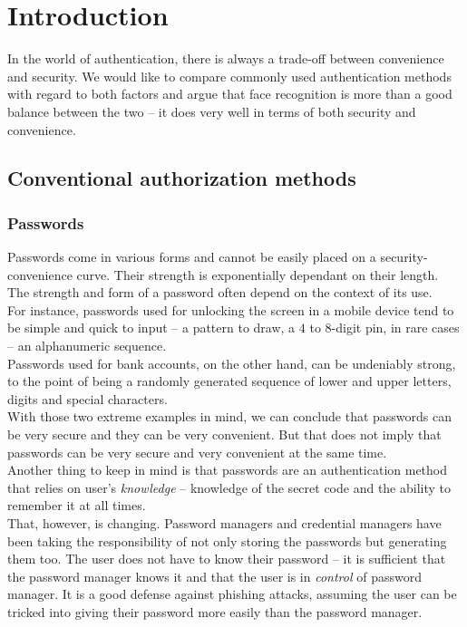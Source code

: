 \chapter{Introduction}
    In the world of authentication, there is always a trade-off between
    convenience and security. We would like to compare commonly used authentication
    methods with regard to both factors and argue that face recognition is more than
    a good balance between the two -- it does very well in terms of both security
    and convenience.

    \section{Conventional authorization methods}
        \subsection*{Passwords}
            Passwords come in various forms and cannot be easily placed on a
            security-convenience curve. Their strength is exponentially dependant
            on their length.\\
            The strength and form of a password often depend on the context of its
            use.\\
            For instance, passwords used for unlocking the screen in a mobile
            device tend to be simple and quick to input -- a pattern to draw, a
            $4$ to $8$-digit pin, in rare cases -- an alphanumeric sequence.\\
            Passwords used for bank accounts, on the other hand, can be undeniably
            strong, to the point of being a randomly generated sequence of lower
            and upper letters, digits and special characters.\\
            With those two extreme examples in mind, we can conclude that passwords
            can be very secure and they can be very convenient. But that does not
            imply that passwords can be very secure and very convenient at the
            same time.\\
            Another thing to keep in mind is that passwords are an authentication
            method that relies on user's \textit{knowledge} -- knowledge of the
            secret code and the ability to remember it at all times.\\
            That, however, is changing. Password managers and credential managers have been taking
            the responsibility of not only storing the passwords but generating
            them too. The user does not have to know their password -- it is sufficient
            that the password manager knows it and that the user is in \textit{control}
            of password manager. It is a good defense against phishing attacks,
            assuming the user can be tricked into giving their password more
            easily than the password manager. \\


